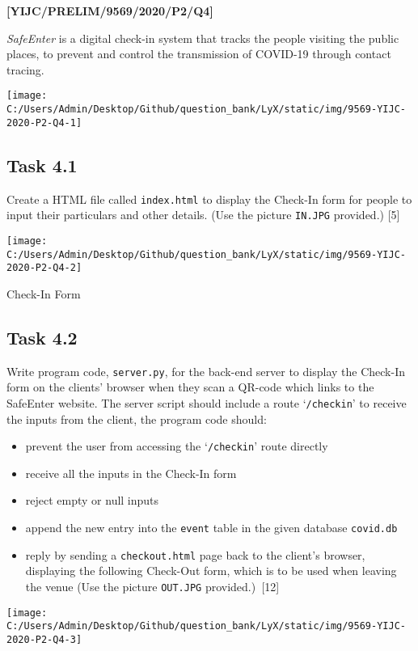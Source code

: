 \item \textbf{{[}YIJC/PRELIM/9569/2020/P2/Q4{]} }

\emph{SafeEnter} is a digital check-in system that tracks the people
visiting the public places, to prevent and control the transmission
of COVID-19 through contact tracing.
\begin{center}
\texttt{[image: C:/Users/Admin/Desktop/Github/question\_bank/LyX/static/img/9569-YIJC-2020-P2-Q4-1]}
\par\end{center}

\subsection*{Task 4.1}

Create a HTML file called \texttt{index.html} to display the Check-In
form for people to input their particulars and other details. (Use
the picture \texttt{IN.JPG} provided.) {[}5{]}
\begin{center}
\texttt{[image: C:/Users/Admin/Desktop/Github/question\_bank/LyX/static/img/9569-YIJC-2020-P2-Q4-2]}
\par\end{center}

\noindent \begin{center}
Check-In Form
\par\end{center}

\subsection*{Task 4.2}

Write program code, \texttt{server.py}, for the back-end server to
display the Check-In form on the clients\textquoteright{} browser
when they scan a QR-code which links to the SafeEnter website. The
server script should include a route \textquoteleft \texttt{/checkin}\textquoteright{}
to receive the inputs from the client, the program code should: 
\begin{itemize}
\item prevent the user from accessing the \textquoteleft \texttt{/checkin}\textquoteright{}
route directly 
\item receive all the inputs in the Check-In form
\item reject empty or null inputs
\item append the new entry into the \texttt{event} table in the given database
\texttt{covid.db }
\item reply by sending a \texttt{checkout.html} page back to the client\textquoteright s
browser, displaying the following Check-Out form, which is to be used
when leaving the venue (Use the picture \texttt{OUT.JPG} provided.)\texttt{
}\hfill{}{[}12{]}
\end{itemize}
\begin{center}
\texttt{[image: C:/Users/Admin/Desktop/Github/question\_bank/LyX/static/img/9569-YIJC-2020-P2-Q4-3]}
\par\end{center}

